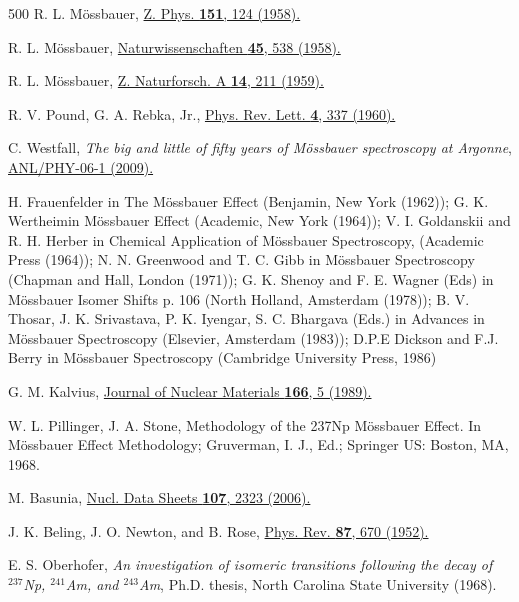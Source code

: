\documentclass[aps,UTF8,prc,twocolumn,preprintnumbers,amsmath,amssymb,floatfix]{revtex4-2}
\begin{document}
\begin{thebibliography}{500}
R. L. M\"{o}ssbauer, \href{https://doi.org/10.1007/BF01344210}{Z. Phys. \textbf{151}, 124 (1958).}

R. L. M\"{o}ssbauer, \href{https://doi.org/10.1007/BF00632050}{Naturwissenschaften \textbf{45}, 538 (1958).}

R. L. M\"{o}ssbauer, \href{https://doi.org/10.1515/zna-1959-0301}{Z. Naturforsch. A \textbf{14}, 211 (1959).}

R. V. Pound, G. A. Rebka, Jr., \href{https://doi.org/10.1103/PhysRevLett.4.337}{Phys. Rev. Lett. \textbf{4}, 337 (1960).}

C. Westfall, \textit{The big and little of fifty years of M\"{o}ssbauer spectroscopy at Argonne}, \href{https://doi.org/10.2172/881585}{ANL/PHY-06-1 (2009).}

H. Frauenfelder in The M\"{o}ssbauer Effect (Benjamin, New York (1962));
G. K. Wertheimin M\"{o}ssbauer Effect (Academic, New York (1964));
V. I. Goldanskii and R. H. Herber in Chemical Application of M\"{o}ssbauer
Spectroscopy, (Academic Press (1964));
N. N. Greenwood and T. C. Gibb in M\"{o}ssbauer Spectroscopy (Chapman and
Hall, London (1971));
G. K. Shenoy and F. E. Wagner (Eds) in M\"{o}ssbauer Isomer Shifts p. 106
(North Holland, Amsterdam (1978));
B. V. Thosar, J. K. Srivastava, P. K. Iyengar, S. C. Bhargava (Eds.) in
Advances in M\"{o}ssbauer Spectroscopy (Elsevier, Amsterdam (1983));
D.P.E Dickson and F.J. Berry in M\"{o}ssbauer Spectroscopy (Cambridge University Press, 1986)

G. M. Kalvius, \href{https://doi.org/10.1016/0029-554X(74)90425-X}{ Journal of Nuclear Materials \textbf{166}, 5 (1989).}

W. L. Pillinger, J. A. Stone, Methodology of the 237Np
M\"{o}ssbauer Effect. In M\"{o}ssbauer Effect Methodology; Gruverman, I. J.,
Ed.; Springer US: Boston, MA, 1968.

M. Basunia, \href{https://doi.org/10.1016/j.nds.2006.07.001}{Nucl. Data Sheets \textbf{107}, 2323 (2006).}

J. K. Beling, J. O. Newton, and B. Rose, \href{https://doi.org/10.1103/PhysRev.87.670}{Phys. Rev. \textbf{87}, 670 (1952).}

E. S. Oberhofer, \textit{An investigation of isomeric transitions following the decay of $^{237}$Np, $^{241}$Am, and $^{243}$Am}, Ph.D. thesis, North Carolina State University (1968).


\end{thebibliography}
\end{document}
